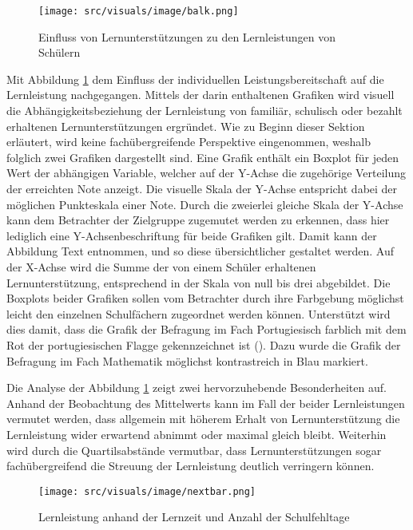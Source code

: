 \begin{figure}[htb]
    \centering
    \texttt{[image: src/visuals/image/balk.png]}
    \caption{Einfluss von Lernunterstützungen zu den Lernleistungen von Schülern}
    \label{fig:balk}
\end{figure}

Mit Abbildung \ref{fig:balk} dem Einfluss der individuellen Leistungsbereitschaft auf die Lernleistung nachgegangen.
Mittels der darin enthaltenen Grafiken wird visuell die Abhängigkeitsbeziehung der Lernleistung von familiär, schulisch oder bezahlt erhaltenen Lernunterstützungen ergründet.
Wie zu Beginn dieser Sektion erläutert, wird keine fachübergreifende Perspektive eingenommen, weshalb folglich zwei Grafiken dargestellt sind.
Eine Grafik enthält ein Boxplot für jeden Wert der abhängigen Variable, welcher auf der Y-Achse die zugehörige Verteilung der erreichten Note anzeigt.
Die visuelle Skala der Y-Achse entspricht dabei der möglichen Punkteskala einer Note.
Durch die zweierlei gleiche Skala der Y-Achse kann dem Betrachter der Zielgruppe zugemutet werden zu erkennen, dass hier lediglich eine Y-Achsenbeschriftung für beide Grafiken gilt.
Damit kann der Abbildung Text entnommen, und so diese übersichtlicher gestaltet werden.
Auf der X-Achse wird die Summe der von einem Schüler erhaltenen Lernunterstützung, entsprechend in der Skala von null bis drei abgebildet.
Die Boxplots beider Grafiken sollen vom Betrachter durch ihre Farbgebung möglichst leicht den einzelnen Schulfächern zugeordnet werden können.
Unterstützt wird dies damit, dass die Grafik der Befragung im Fach Portugiesisch farblich mit dem Rot der portugiesischen Flagge gekennzeichnet ist (\cite[]{Wikipedia.2024}).
Dazu wurde die Grafik der Befragung im Fach Mathematik möglichst kontrastreich in Blau markiert.

Die Analyse der Abbildung \ref{fig:balk} zeigt zwei hervorzuhebende Besonderheiten auf.
Anhand der Beobachtung des Mittelwerts kann im Fall der beider Lernleistungen vermutet werden, dass allgemein mit höherem Erhalt von Lernunterstützung die Lernleistung wider erwartend abnimmt oder maximal gleich bleibt.
Weiterhin wird durch die Quartilsabstände vermutbar, dass Lernunterstützungen sogar fachübergreifend die Streuung der Lernleistung deutlich verringern können.

\begin{figure}[htb]
    \centering
    \texttt{[image: src/visuals/image/nextbar.png]}
    \caption{Lernleistung anhand der Lernzeit und Anzahl der Schulfehltage}
    \label{fig:nextbar}
\end{figure}

